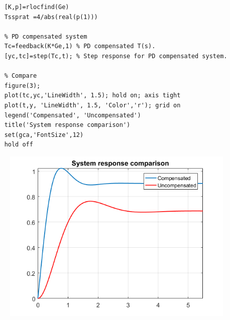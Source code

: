\documentclass[a4paper,11pt]{article}
\begin{document}
\begin{enumerate}
\begin{lstlisting}
	[K,p]=rlocfind(Ge)
	Tssprat =4/abs(real(p(1)))
	
	% PD compensated system
	Tc=feedback(K*Ge,1) % PD compensated T(s).
	[yc,tc]=step(Tc,t); % Step response for PD compensated system.
	
	% Compare
	figure(3);
	plot(tc,yc,'LineWidth', 1.5); hold on; axis tight
	plot(t,y, 'LineWidth', 1.5, 'Color','r'); grid on
	legend('Compensated', 'Uncompensated')
	title('System response comparison')
	set(gca,'FontSize',12)
	hold off
	\end{lstlisting}
	\begin{figure}[H]  \includegraphics [scale=0.9] {Figures/exercise5} \end{figure}
\end{enumerate}
\end{document}
